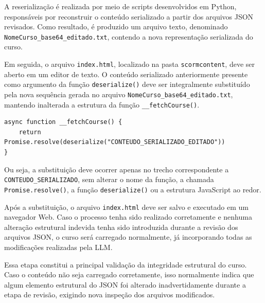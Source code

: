\documentclass[12pt,a4paper]{article}
\begin{document}
A reserialização é realizada por meio de scripts desenvolvidos em Python, responsáveis por reconstruir o conteúdo serializado a partir dos arquivos JSON revisados. Como resultado, é produzido um arquivo texto, denominado \texttt{NomeCurso\_base64\_editado.txt}, contendo a nova representação serializada do curso.

Em seguida, o arquivo \texttt{index.html}, localizado na pasta \texttt{scormcontent}, deve ser aberto em um editor de texto. O conteúdo serializado anteriormente presente como argumento da função \texttt{deserialize()} deve ser integralmente substituído pela nova sequência gerada no arquivo \texttt{NomeCurso\_base64\_editado.txt}, mantendo inalterada a estrutura da função \texttt{\_\_fetchCourse()}.

\begin{verbatim}
async function __fetchCourse() {
    return Promise.resolve(deserialize("CONTEUDO_SERIALIZADO_EDITADO"))
}
\end{verbatim}

Ou seja, a substituição deve ocorrer apenas no trecho correspondente a \texttt{CONTEUDO\_SERIALIZADO}, sem alterar o nome da função, a chamada \texttt{Promise.resolve()}, a função \texttt{deserialize()} ou a estrutura JavaScript ao redor.

Após a substituição, o arquivo \texttt{index.html} deve ser salvo e executado em um navegador Web. Caso o processo tenha sido realizado corretamente e nenhuma alteração estrutural indevida tenha sido introduzida durante a revisão dos arquivos JSON, o curso será carregado normalmente, já incorporando todas as modificações realizadas pela LLM.

Essa etapa constitui a principal validação da integridade estrutural do curso. Caso o conteúdo não seja carregado corretamente, isso normalmente indica que algum elemento estrutural do JSON foi alterado inadvertidamente durante a etapa de revisão, exigindo nova inspeção dos arquivos modificados.
\end{document}
